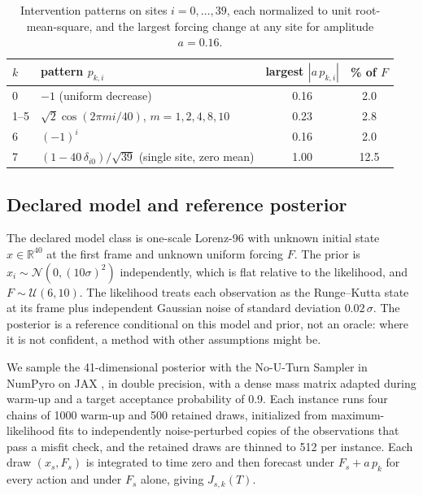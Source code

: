 \documentclass[11pt]{article}
\begin{document}
\begin{table}[t]
\centering
\small
\caption{Intervention patterns on sites $i = 0,\dots,39$, each normalized to unit root-mean-square, and the largest forcing change at any site for amplitude $a = 0.16$.}
\label{tab:patterns}
\begin{tabular}{llcc}
\toprule
$k$ & pattern $p_{k,i}$ & largest $|a\,p_{k,i}|$ & \% of $F$ \\
\midrule
0 & $-1$ (uniform decrease) & 0.16 & 2.0 \\
1--5 & $\sqrt2\cos(2\pi m i/40)$, $m = 1, 2, 4, 8, 10$ & 0.23 & 2.8 \\
6 & $(-1)^i$ & 0.16 & 2.0 \\
7 & $(1 - 40\,\delta_{i0})/\sqrt{39}$ (single site, zero mean) & 1.00 & 12.5 \\
\bottomrule
\end{tabular}
\end{table}

\subsection{Declared model and reference posterior}
The declared model class is one-scale Lorenz-96 with unknown initial state $x \in \mathbb R^{40}$ at the first frame and unknown uniform forcing $F$. The prior is $x_i \sim \mathcal N(0, (10\sigma)^2)$ independently, which is flat relative to the likelihood, and $F \sim \mathcal U(6, 10)$. The likelihood treats each observation as the Runge--Kutta state at its frame plus independent Gaussian noise of standard deviation $0.02\,\sigma$. The posterior is a reference conditional on this model and prior, not an oracle: where it is not confident, a method with other assumptions might be.

We sample the 41-dimensional posterior with the No-U-Turn Sampler \citep{hoffman2014nouturn} in NumPyro \citep{phan2019composable} on JAX \citep{bradbury2018jax}, in double precision, with a dense mass matrix adapted during warm-up and a target acceptance probability of 0.9. Each instance runs four chains of 1000 warm-up and 500 retained draws, initialized from maximum-likelihood fits to independently noise-perturbed copies of the observations that pass a misfit check, and the retained draws are thinned to 512 per instance. Each draw $(x_s, F_s)$ is integrated to time zero and then forecast under $F_s + a\,p_k$ for every action and under $F_s$ alone, giving $J_{s,k}(T)$.
\end{document}
